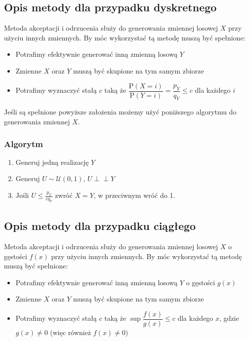 \documentclass[12pt]{mwrep}
\newcommand{\indep}{\perp \!\!\! \perp}
\begin{document}
	\subsection{Opis metody dla przypadku dyskretnego\textsuperscript{\cite{AO - dyskretny}}}
	Metoda akceptacji i odrzucenia służy do generowania zmiennej losowej $X$ przy użyciu innych zmiennych. By móc wykorzystać tą metodę muszą być spełnione:
	\begin{itemize}[leftmargin=10mm]
		\item Potrafimy efektywnie generować inną zmienną losową $Y$
		\item Zmienne $X$ oraz $Y$ muszą być skupione na tym samym zbiorze
		\item Potrafimy wyznaczyć stałą $c$ taką że $\dfrac{\mathrm{P}(X=i)}{\mathrm{P}(Y=i)}=\dfrac{p_Y}{q_Y}\leqslant c$ dla każdego $i$
	\end{itemize}
	Jeśli są spełnione powyższe założenia możemy użyć poniższego algorytmu do generowania zmiennej $X$.
	\subsubsection{Algorytm}
	\begin{enumerate}[leftmargin=10mm]
		\item Generuj jedną realizację $Y$
		\item Generuj $U\sim \mathcal{U}(0,1)$, $U\indep Y$
		\item Jeśli $U\leqslant\frac{p_Y}{cq_Y}$ zwróć $X=Y$, w przeciwnym wróć do 1.
	\end{enumerate}
	
	
	\subsection{Opis metody dla przypadku ciągłego\textsuperscript{\cite{AO - ciagly}}}
	Metoda akceptacji i odrzucenia służy do generowania zmiennej losowej $X$ o gęstości $f(x)$ przy użyciu innych zmiennych. By móc wykorzystać tą metodę muszą być spełnione:
	\begin{itemize}[leftmargin=10mm]
		\item Potrafimy efektywnie generować inną zmienną losową $Y$ o gęstości $g(x)$
		\item Zmienne $X$ oraz $Y$ muszą być skupione na tym samym zbiorze
		\item Potrafimy wyznaczyć stałą $c$ taką że $\sup\dfrac{f(x)}{g(x)}\leqslant c$ dla każdego $x$, gdzie $g(x)\neq0$ (więc również $f(x)\neq0$)
	\end{itemize}
\end{document}
